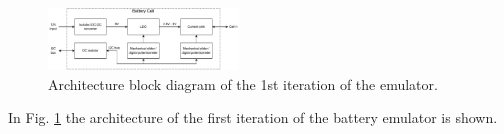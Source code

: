 \begin{figure}[!th]
    \begin{center}
        \includegraphics[width=0.45\textwidth]{Battery_cell_diagram-Single_cell.pdf}
    \end{center}
    \caption{Architecture block diagram of the 1st iteration of the emulator.}
    \label{fig:1st_architecture}
\end{figure}

In Fig. \ref{fig:1st_architecture} the architecture of the first iteration 
of the battery emulator is shown.